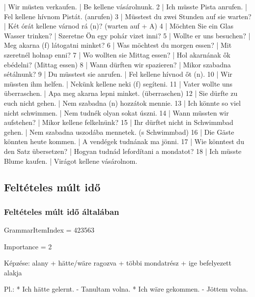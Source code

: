 \documentclass{article}
\newenvironment{desc}{\verbatim}{\endverbatim}
\newenvironment{exmp}{\verbatim}{\endverbatim}
\begin{document}
\begin{exmp}
1 | Wir müsten verkaufen. | Be kellene vásárolnunk.
2 | Ich müsste Pista anrufen. | Fel kellene hívnom Pistát. (anrufen)
3 | Müsstest du zwei Stunden auf sie warten? | Két órát kellene várnod rá (n)? (warten auf + A)
4 | Möchten Sie ein Glas Wasser trinken? | Szeretne Ön egy pohár vizet inni?
5 | Wollte er uns besuchen? | Meg akarna (f) látogatni minket?
6 | Was möchtest du morgen essen? | Mit szeretnél holnap enni?
7 | Wo wollten sie Mittag essen? | Hol akarnának ők ebédelni? (Mittag essen)
8 | Wann dürften wir spazieren? | Mikor szabadna sétálnunk?
9 | Du müsstest sie anrufen. | Fel kellene hívnod őt (n).
10 | Wir müssten ihm helfen. | Nekünk kellene neki (f) segíteni.
11 | Vater wollte uns überraschen. | Apa meg akarna lepni minket. (überraschen)
12 | Sie dürfte zu euch nicht gehen. | Nem szabadna (n) hozzátok mennie.
13 | Ich könnte so viel nicht schwimmen. | Nem tudnék olyan sokat úszni.
14 | Wann müssten wir aufstehen? | Mikor kellene felkelnünk?
15 | Ihr dürftet nicht in Schwimmbad gehen. | Nem szabadna uszodába mennetek. (s Schwimmbad)
16 | Die Gäste könnten heute kommen. | A vendégek tudnának ma jönni.
17 | Wie könntest du den Satz übersetzen? | Hogyan tudnád lefordítani a mondatot?
18 | Ich müsste Blume kaufen. | Virágot kellene vásárolnom.
\end{exmp}

\subsection{Feltételes múlt idő}

\subsubsection{Feltételes múlt idő általában}

GrammarItemIndex = 423563

Importance = 2

\begin{desc}
Képzése:
alany + hätte/wäre ragozva + többi mondatrész + ige befelyezett alakja

Pl.: * Ich hätte gelernt. - Tanultam volna.
* Ich wäre gekommen. - Jöttem volna.
\end{desc}
\end{document}
